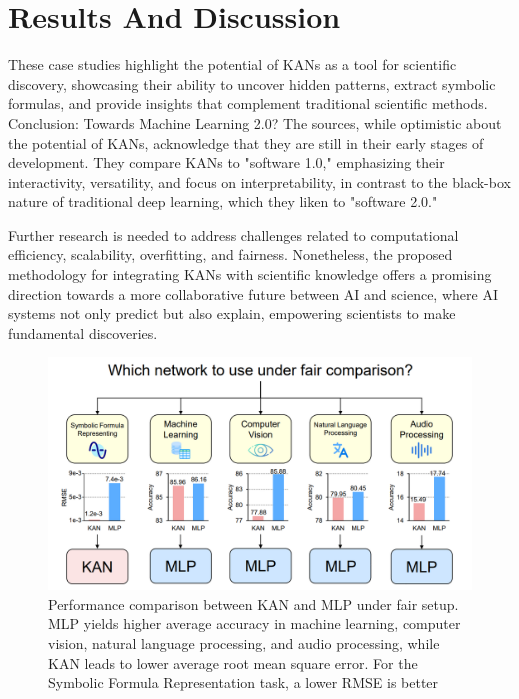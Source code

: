 \clearpage

\section{Results And Discussion}

These case studies highlight the potential of KANs as a tool for scientific
discovery, showcasing their ability to uncover hidden patterns, extract
symbolic formulas, and provide insights that complement traditional scientific
methods. Conclusion: Towards Machine Learning 2.0? The sources, while
optimistic about the potential of KANs, acknowledge that they are still in
their early stages of development. They compare KANs to "software 1.0,"
emphasizing their interactivity, versatility, and focus on interpretability, in
contrast to the black-box nature of traditional deep learning, which they liken
to "software 2.0." 

Further research is needed to address challenges related to
computational efficiency, scalability, overfitting, and fairness. Nonetheless,
the proposed methodology for integrating KANs with scientific knowledge offers
a promising direction towards a more collaborative future between AI and
science, where AI systems not only predict but also explain, empowering
scientists to make fundamental discoveries.

\begin{figure}[t]
    \centering
    \includegraphics[width=0.9\linewidth]{Images/kan_vs_mlp.png}
    \caption{Performance comparison between KAN and MLP under fair setup. MLP yields higher
    average accuracy in machine learning, computer vision, natural language processing, and audio
    processing, while KAN leads to lower average root mean square error. For the Symbolic Formula
    Representation task, a lower RMSE is better}
\end{figure}

